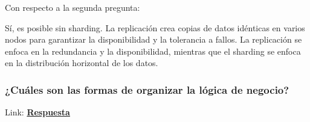 \documentclass{article}
\begin{document}
  Con respecto a la segunda pregunta: 

  Sí,  es posible sin sharding. La replicación crea copias de datos idénticas en varios nodos para garantizar la disponibilidad y la tolerancia a fallos. La replicación se enfoca en la redundancia y la disponibilidad, mientras que el sharding se enfoca en la distribución horizontal de los datos.



  \subsubsection{¿Cuáles son las formas de organizar la lógica de negocio?}
  Link: \textbf{\hyperlink{page.51}{Respuesta}} 
\end{document}
